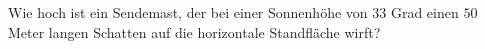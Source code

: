 
Wie hoch ist ein Sendemast, der bei einer Sonnenhöhe von $33$ Grad einen $50$ Meter langen
Schatten auf die horizontale Standfläche wirft?
